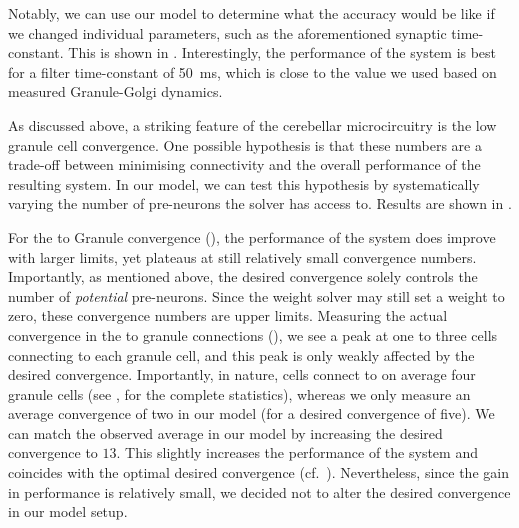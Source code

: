 Notably, we can use our model to determine what the accuracy would be like if we changed individual parameters, such as the aforementioned synaptic time-constant.
This is shown in .
Interestingly, the performance of the system is best for a filter time-constant of \SI{50}{\milli\second}, which is close to the value we used based on measured Granule-Golgi dynamics.

As discussed above, a striking feature of the cerebellar microcircuitry is the low granule cell convergence. One possible hypothesis is that these numbers are a trade-off between minimising connectivity and the overall performance of the resulting system.
In our model, we can test this hypothesis by systematically varying the number of pre-neurons the solver has access to. Results are shown in .

For the \PCN to Granule convergence (), the performance of the system does improve with larger limits, yet plateaus at still relatively small convergence numbers.
Importantly, as mentioned above, the desired convergence solely controls the number of \emph{potential} pre-neurons.
Since the weight solver may still set a weight to zero, these convergence numbers are upper limits.
Measuring the actual convergence in the \PCN to granule connections (), we see a peak at one to three \PCN cells connecting to each granule cell, and this peak is only weakly affected by the desired convergence.
Importantly, in nature, \PCN cells connect to on average four granule cells (see \cite{palkovits1972quantitative}, for the complete statistics), whereas we only measure an average convergence of two in our model (for a desired convergence of five).
We can match the observed average in our model by increasing the desired convergence to $13$.
This slightly increases the performance of the system and coincides with the optimal desired convergence (cf.~).
Nevertheless, since the gain in performance is relatively small, we decided not to alter the desired convergence in our model setup.

